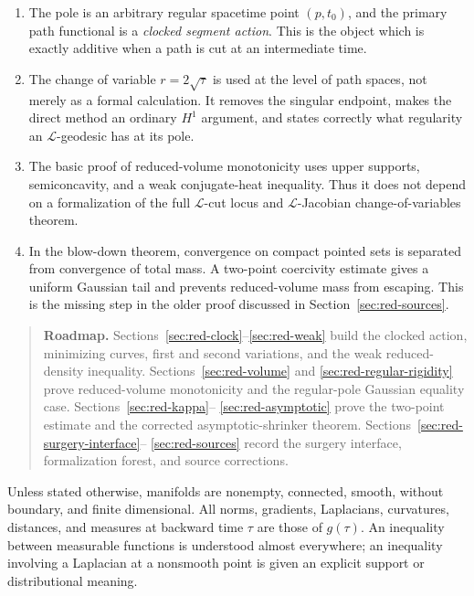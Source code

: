 \documentclass[10pt]{coll-l}
\newenvironment{roadmap}[1]{%
  \begin{quote}\small\noindent\textbf{Roadmap.} #1\par\medskip\noindent
}{\end{quote}}
\theoremstyle{definition}
\theoremstyle{remark}
\numberwithin{section}{chapter}
\numberwithin{equation}{chapter}
\begin{document}
\begin{enumerate}
\item The pole is an arbitrary regular spacetime point $(p,t_0)$, and the
      primary path functional is a \emph{clocked segment action}.  This is
      the object which is exactly additive when a path is cut at an
      intermediate time.
\item The change of variable $r=2\sqrt\tau$ is used at the level of path
      spaces, not merely as a formal calculation.  It removes the singular
      endpoint, makes the direct method an ordinary $H^1$ argument, and
      states correctly what regularity an $\mathcal L$-geodesic has at its
      pole.
\item The basic proof of reduced-volume monotonicity uses upper supports,
      semiconcavity, and a weak conjugate-heat inequality.  Thus it does not
      depend on a formalization of the full $\mathcal L$-cut locus and
      $\mathcal L$-Jacobian change-of-variables theorem.
\item In the blow-down theorem, convergence on compact pointed sets is
      separated from convergence of total mass.  A two-point coercivity
      estimate gives a uniform Gaussian tail and prevents reduced-volume
      mass from escaping.  This is the missing step in the older proof
      discussed in Section~\ref{sec:red-sources}.
\end{enumerate}

\begin{roadmap}{Sections~\ref{sec:red-clock}--\ref{sec:red-weak} build the
clocked action, minimizing curves, first and second variations, and the weak
reduced-density inequality.  Sections~\ref{sec:red-volume} and
\ref{sec:red-regular-rigidity} prove reduced-volume monotonicity and the
regular-pole Gaussian equality case.  Sections~\ref{sec:red-kappa}--
\ref{sec:red-asymptotic} prove the two-point estimate and the corrected
asymptotic-shrinker theorem.  Sections~\ref{sec:red-surgery-interface}--
\ref{sec:red-sources} record the surgery interface, formalization forest,
and source corrections.}
\end{roadmap}

Unless stated otherwise, manifolds are nonempty, connected, smooth, without
boundary, and finite dimensional.  All norms, gradients, Laplacians,
curvatures, distances, and measures at backward time $\tau$ are those of
$g(\tau)$.  An inequality between measurable functions is understood almost
everywhere; an inequality involving a Laplacian at a nonsmooth point is
given an explicit support or distributional meaning.
\end{document}
